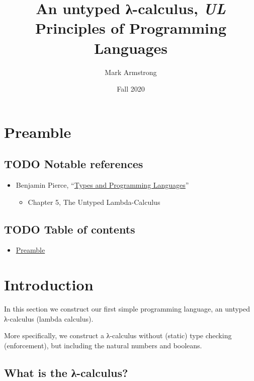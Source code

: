 \documentclass[11pt]{article}
\author{Mark Armstrong}
\date{Fall 2020}
\title{An untyped λ-calculus, \emph{UL}\\\medskip
\large Principles of Programming Languages}
\theoremstyle{definition}
\begin{document}
\maketitle

\section{Preamble}
\label{sec:orgb6efdf0}

\subsection{{\bfseries\sffamily TODO} Notable references}
\label{sec:orgadda15e}

\begin{itemize}
\item Benjamin Pierce,
“\href{https://ebookcentral.proquest.com/lib/mcmu/detail.action?docID=3338823}{Types and Programming Languages}”
\begin{itemize}
\item Chapter 5, The Untyped Lambda-Calculus
\end{itemize}
\end{itemize}

\subsection{{\bfseries\sffamily TODO} Table of contents}
\label{sec:org0a76511}

\begin{scriptsize}
\begin{itemize}
\item \hyperref[sec:orgb6efdf0]{Preamble}
\end{itemize}
\end{scriptsize}

\section{Introduction}
\label{sec:org3714423}

In this section we construct our first simple programming language,
an untyped λ-calculus (lambda calculus).

More specifically, we construct a λ-calculus
without (static) type checking (enforcement),
but including the natural numbers and booleans.

\subsection{What is the λ-calculus?}
\label{sec:org5963cc1}
\end{document}
